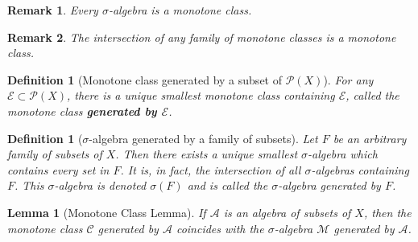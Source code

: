 \documentclass[11pt, letter]{book}
\newtheorem{lemma}[theorem]{Lemma}
\newtheorem{definition}[theorem]{Definition}
\newtheorem{remark}{Remark}
\begin{document}
\begin{remark}
Every $\sigma$-algebra is a monotone class.
\end{remark}
\begin{remark}
The intersection of any family of monotone classes is a monotone class.
\end{remark}
\begin{definition}[Monotone class generated by a subset of $\mathcal{P}(X)$]
For any $\mathcal{E} \subset \mathcal{P}(X)$, there is a unique smallest monotone class containing $\mathcal{E}$, called the monotone class \textbf{generated by $\mathcal{E}$}. 
\end{definition}
\begin{definition}[$\sigma$-algebra generated by a family of subsets]
Let $F$ be an arbitrary family of subsets of $X$. Then there exists a unique smallest $\sigma$-algebra which contains every set in $F$. It is, in fact, the intersection of all $\sigma$-algebras containing $F$. This $\sigma$-algebra is denoted $\sigma(F)$ and is called the $\sigma$-algebra generated by $F$.
\end{definition}
\begin{lemma}[Monotone Class Lemma]
If $\mathcal{A}$ is an algebra of subsets of $X$, then the monotone class $\mathcal{C}$ generated by $\mathcal{A}$ coincides with the $\sigma$-algebra $\mathcal{M}$ generated by $\mathcal{A}$. 
\end{lemma}
\end{document}
